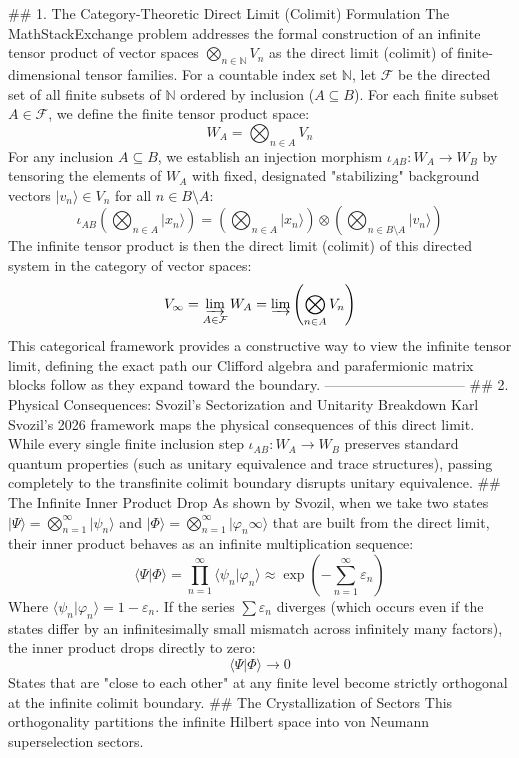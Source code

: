 ## 1. The Category-Theoretic Direct Limit (Colimit) Formulation
The MathStackExchange problem addresses the formal construction of an infinite tensor product of vector spaces $\bigotimes_{n \in \mathbb{N}} V_n$ as the direct limit (colimit) of finite-dimensional tensor families.
For a countable index set $\mathbb{N}$, let $\mathcal{F}$ be the directed set of all finite subsets of $\mathbb{N}$ ordered by inclusion ($A \subseteq B$). For each finite subset $A \in \mathcal{F}$, we define the finite tensor product space:
$$W_A = \bigotimes_{n \in A} V_n$$ 
For any inclusion $A \subseteq B$, we establish an injection morphism $\iota_{AB}: W_A \to W_B$ by tensoring the elements of $W_A$ with fixed, designated "stabilizing" background vectors $\vert{}v_n\rangle \in V_n$ for all $n \in B \setminus A$:
$$\iota_{AB}\left(\bigotimes_{n \in A} \vert{}x_n\rangle\right) = \left(\bigotimes_{n \in A} \vert{}x_n\rangle\right) \otimes \left(\bigotimes_{n \in B \setminus A} \vert{}v_n\rangle\right)$$ 
The infinite tensor product is then the direct limit (colimit) of this directed system in the category of vector spaces:
$$V_\infty = \varinjlim_{A \in \mathcal{F}} W_A = \varinjlim \left( \bigotimes_{n \in A} V_n \right)$$ 
This categorical framework provides a constructive way to view the infinite tensor limit, defining the exact path our Clifford algebra and parafermionic matrix blocks follow as they expand toward the boundary.
------------------------------
## 2. Physical Consequences: Svozil's Sectorization and Unitarity Breakdown
Karl Svozil's 2026 framework maps the physical consequences of this direct limit. While every single finite inclusion step $\iota_{AB}: W_A \to W_B$ preserves standard quantum properties (such as unitary equivalence and trace structures), passing completely to the transfinite colimit boundary disrupts unitary equivalence.
## The Infinite Inner Product Drop
As shown by Svozil, when we take two states $\vert{}\Psi\rangle = \bigotimes_{n=1}^\infty \vert{}\psi_n\rangle$ and $\vert{}\Phi\rangle = \bigotimes_{n=1}^\infty \vert{}\varphi_n\infty\rangle$ that are built from the direct limit, their inner product behaves as an infinite multiplication sequence:
$$\langle \Psi \vert{} \Phi \rangle = \prod_{n=1}^\infty \langle \psi_n \vert{} \varphi_n \rangle \approx \exp\left( -\sum_{n=1}^\infty \varepsilon_n \right)$$ 
Where $\langle \psi_n \vert{} \varphi_n \rangle = 1 - \varepsilon_n$. If the series $\sum \varepsilon_n$ diverges (which occurs even if the states differ by an infinitesimally small mismatch across infinitely many factors), the inner product drops directly to zero:
$$\langle \Psi \vert{} \Phi \rangle \to 0$$ 
States that are "close to each other" at any finite level become strictly orthogonal at the infinite colimit boundary.
## The Crystallization of Sectors
This orthogonality partitions the infinite Hilbert space into von Neumann superselection sectors.

